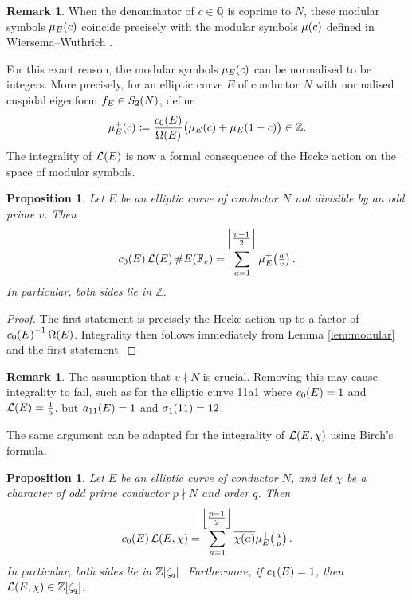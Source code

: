 \documentclass{article}
\theoremstyle{plain}
\newtheorem{proposition}[n]{Proposition}
\theoremstyle{definition}
\newtheorem{remark}[n]{Remark}
\newcommand{\FF}{\mathbb{F}}
\newcommand{\LLL}{\mathcal{L}}
\newcommand{\QQ}{\mathbb{Q}}
\newcommand{\ZZ}{\mathbb{Z}}
\newcommand{\br}{\!\del}
\newcommand{\fbr}[2][-1]{\!\ifthenelse{\equal{#1}{-1}}{\left\lfloor#2\right\rfloor}{}\ifthenelse{\equal{#1}{0}}{\lfloor#2\rfloor}{}\ifthenelse{\equal{#1}{1}}{\bigl\lfloor#2\bigr\rfloor}{}}
\begin{document}
\begin{remark}
When the denominator of $ c \in \QQ $ is coprime to $ N $, these modular symbols $ \mu_E\br{c} $ coincide precisely with the modular symbols $ \mu\br{c} $ defined in Wiersema--Wuthrich \cite[Section 2]{WW22}.
\end{remark}

For this exact reason, the modular symbols $ \mu_E\br{c} $ can be normalised to be integers. More precisely, for an elliptic curve $ E $ of conductor $ N $ with normalised cuspidal eigenform $ f_E \in S_2\br{N} $, define
$$ \mu_E^+\br{c} \coloneqq \dfrac{c_0\br{E}}{\Omega\br{E}}\br{\mu_E\br{c} + \mu_E\br{1 - c}} \in \ZZ. $$
The integrality of $ \LLL\br{E} $ is now a formal consequence of the Hecke action on the space of modular symbols.

\begin{proposition}
\label{prop:untwisted}
Let $ E $ be an elliptic curve of conductor $ N $ not divisible by an odd prime $ v $. Then
$$ c_0\br{E}\LLL\br{E}\#E\br{\FF_v} = \sum_{a = 1}^{\fbr{\tfrac{v - 1}{2}}} \mu_E^+\br{\tfrac{a}{v}}. $$
In particular, both sides lie in $ \ZZ $.
\end{proposition}

\begin{proof}
The first statement is precisely the Hecke action \cite[Theorem 4.2]{Man72} up to a factor of $ c_0\br{E}^{-1}\Omega\br{E} $. Integrality then follows immediately from Lemma \ref{lem:modular} and the first statement.
\end{proof}

\pagebreak

\begin{remark}
The assumption that $ v \nmid N $ is crucial. Removing this may cause integrality to fail, such as for the elliptic curve 11a1 where $ c_0\br{E} = 1 $ and $ \LLL\br{E} = \tfrac{1}{5} $, but $ a_{11}\br{E} = 1 $ and $ \sigma_1\br{11} = 12 $.
\end{remark}

The same argument can be adapted for the integrality of $ \LLL\br{E, \chi} $ using Birch's formula.

\begin{proposition}
\label{prop:twisted}
Let $ E $ be an elliptic curve of conductor $ N $, and let $ \chi $ be a character of odd prime conductor $ p \nmid N $ and order $ q $. Then
$$ c_0\br{E}\LLL\br{E, \chi} = \sum_{a = 1}^{\fbr{\tfrac{p - 1}{2}}} \overline{\chi\br{a}}\mu_E^+\br[1]{\tfrac{a}{p}}. $$
In particular, both sides lie in $ \ZZ\sbr[0]{\zeta_q} $. Furthermore, if $ c_1\br{E} = 1 $, then $ \LLL\br{E, \chi} \in \ZZ\sbr[0]{\zeta_q} $.
\end{proposition}
\end{document}
